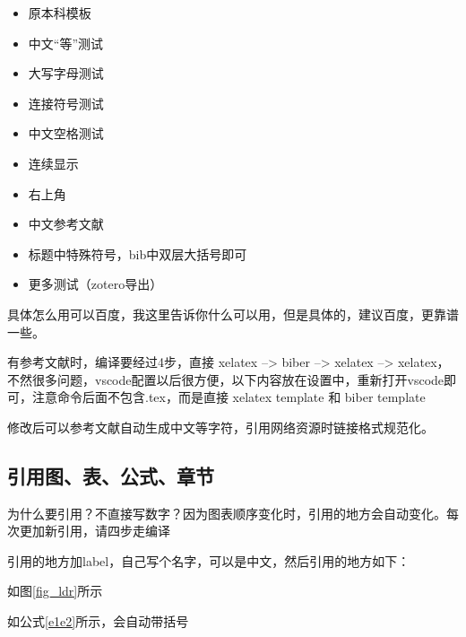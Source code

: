 \documentclass[AutoFakeBold]{LZUThesis}
\begin{document}
\begin{itemize}
    \item 原本科模板\cite{partl2016}
    \item 中文“等”测试\cite{partl2021}
    \item 大写字母测试\cite{partl2022-2}
    \item 连接符号测试\cite{partl2022-3}
    \item 中文空格测试\cite{partl2022}
    \item 连续显示\cite{partl2021,partl2022-2,partl2022-3}
    \item 右上角\cite{partl2016,partl2021,partl2022-2}
    \item 中文参考文献 \cite{李刚2006基于动态光谱的脉搏血氧测量精度分析}
    \item 标题中特殊符号，bib中双层大括号即可 \cite{PhysRevLett.108.024101}
    \item 更多测试（zotero导出）\cite{huangInvestigationThermalRectification2024, wanModulatingThermalConductivity2024, wuThermalRectificationAsymmetric2024, xiaoMOFNanozymemediatedAcetylcholinesterasefree2024}
\end{itemize}


具体怎么用可以百度，我这里告诉你什么可以用，但是具体的，建议百度，更靠谱一些。


有参考文献时，编译要经过4步，直接 xelatex --> biber --> xelatex --> xelatex，不然很多问题，vscode配置以后很方便，以下内容放在设置中，重新打开vscode即可，注意命令后面不包含.tex，而是直接 xelatex template 和 biber template

修改后可以参考文献自动生成中文等字符\cite{partl2021}\cite{partl2022}\cite{partl2022-2}，引用网络资源时链接格式规范化\cite{intelnewsroomIntelUnveils12th2021,wilsonHistoryDevelopmentParallel1994}。




\subsection{引用图、表、公式、章节}

为什么要引用？不直接写数字？因为图表顺序变化时，引用的地方会自动变化。每次更加新引用，请四步走编译

引用的地方加label，自己写个名字，可以是中文，然后引用的地方如下：

如图\ref{fig_ldr}所示

如公式\eqref{e1e2}所示，会自动带括号
\end{document}
